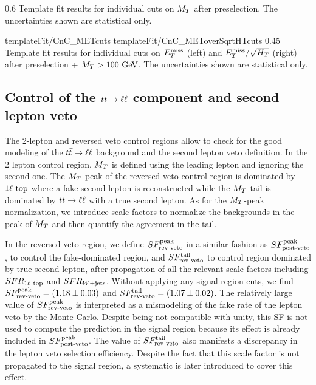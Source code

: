                  {0.6}
                 {Template fit results for individual cuts on $M_T$ after
                 preselection. The uncertainties shown are statistical only.}

                     {templateFit/CnC_METcuts}
                     {templateFit/CnC_METoverSqrtHTcuts}
                     {0.45}
                     {Template fit results for individual cuts on $E_T^\text{miss}$ (left)
                     and $E_T^\text{miss}/\sqrt{H_T}$ (right) after preselection + $M_T >
                     100~\text{GeV}$.  The uncertainties shown are statistical only.}

    \subsection{Control of the $t\bar{t} \rightarrow \ell \ell$ component and second lepton veto \label{sec:analysis_controlDileptonTop}}

    The 2-lepton and reversed veto control regions allow to check for the good
    modeling of the $t\bar{t} \rightarrow \ell \ell$ background and the second lepton veto
    definition. In the 2 lepton control region, $M_T$ is defined using the
    leading lepton and ignoring the second one. The $M_T$-peak of the reversed
    veto control region is dominated by $1\ell~\text{top}$ where a fake second
    lepton is reconstructed while the $M_T$-tail is dominated by $t\bar{t} \rightarrow \ell \ell$
    with a true second lepton. As for the $M_T$-peak normalization, we introduce
    scale factors to normalize the backgrounds in the peak of $M_T$ and then
    quantify the agreement in the tail.

    In the reversed veto region, we define $SF_{\text{rev-veto}}^{\text{peak}}$ in a similar fashion as
    $SF_{\text{post-veto}}^{\text{peak}}$, to control the fake-dominated region, and $SF_{\text{rev-veto}}^{\text{tail}}$ to
    control region dominated by true second lepton, after propagation of all the
    relevant scale factors including $SFR_{1\ell~\text{top}}$ and $SFR_{\text{$W$+jets}}$.
    Without applying any signal region cuts, we find $SF_{\text{rev-veto}}^{\text{peak}} = (1.18 \pm 0.03)$
    and $SF_{\text{rev-veto}}^{\text{tail}} = (1.07 \pm 0.02)$. The relatively large value of $SF_{\text{rev-veto}}^{\text{peak}}$
    is interpreted as a mismodeling of the fake rate of the lepton veto by the
    Monte-Carlo.  Despite being not compatible with unity, this SF is not used
    to compute the prediction in the signal region because its effect is already
    included in $SF_{\text{post-veto}}^{\text{peak}}$. The value of $SF_{\text{rev-veto}}^{\text{tail}}$ also manifests a
    discrepancy in the lepton veto selection efficiency. Despite the fact that
    this scale factor is not propagated to the signal region, a systematic is
    later introduced to cover this effect.

